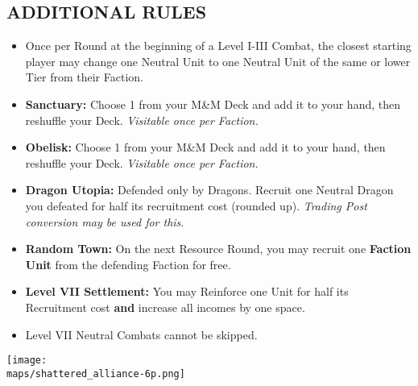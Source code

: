\begin{multicols*}{2}
\subsection*{\MakeUppercase{Additional Rules}}
\begin{itemize}
  \item Once per Round at the beginning of a Level I-III Combat, the closest starting player may change one Neutral Unit to one Neutral Unit of the same or lower Tier from their Faction.
  \item \textbf{Sanctuary:} Choose 1  from your M\&M Deck and add it to your hand, then reshuffle your Deck. \textit{Visitable once per Faction.}
  \item \textbf{Obelisk:} Choose 1  from your M\&M Deck and add it to your hand, then reshuffle your Deck. \textit{Visitable once per Faction.}
  \item \textbf{Dragon Utopia:} Defended only by Dragons. Recruit one Neutral Dragon you defeated for half its recruitment cost (rounded up). \textit{Trading Post conversion may be used for this}.
  \item \textbf{Random Town:} On the next Resource Round, you may recruit one \textbf{Faction Unit} from the defending Faction for free.
  \item \textbf{Level VII Settlement:} You may Reinforce one Unit for half its Recruitment cost \textbf{and} increase all incomes by one space.
  \item Level VII Neutral Combats cannot be skipped.
\end{itemize}

\begin{center}
  \vspace*{\fill}
  \texttt{[image: \\maps/shattered\_alliance-6p.png]}
  \vspace*{\fill}
\end{center}

\columnbreak


\end{multicols*}
